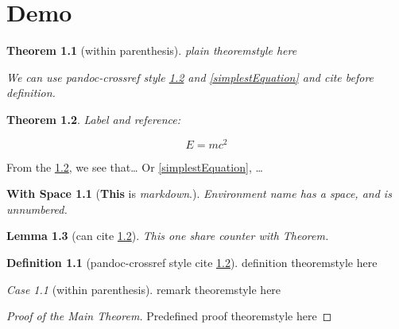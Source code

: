 \theoremstyle{plain}
\newtheorem{Theorem}{Theorem}[section]
\newtheorem{Lemma}[Theorem]{Lemma}
\newtheorem{Corollary}[Theorem]{Corollary}
\newtheorem*{With Space}{With Space}
\newtheorem{Proposition}{Proposition}[section]
\newtheorem{Conjecture}[Proposition]{Conjecture}
\newtheorem{WithoutSpace}{WithoutSpace}[section]
\newtheorem{KL}{Klein’s Lemma}[section]
\theoremstyle{definition}
\newtheorem{Definition}{Definition}[section]
\theoremstyle{remark}
\newtheorem{Case}{Case}[section]

\hypertarget{demo}{%
\chapter{Demo}\label{demo}}

\begin{Theorem}[within parenthesis]
plain theoremstyle \emph{here}

We can use pandoc-crossref style \ref{simplestEquation} and
\eqref{simplestEquation} and cite before definition.
\end{Theorem}

\begin{Theorem}\label{simplestEquation}
\leavevmode{}%
Label and reference:

\[E=mc^2\]
\end{Theorem}

From the \ref{simplestEquation}, we see that\ldots{} Or
\eqref{simplestEquation}, \ldots{}

\begin{With Space}[\textbf{This} is \emph{markdown}.]
Environment name has a space, and is unnumbered.
\end{With Space}

\begin{Lemma}[can cite \ref{simplestEquation}]
This one share counter with Theorem.
\end{Lemma}

\begin{Definition}[pandoc-crossref style cite \ref{simplestEquation}]
definition theoremstyle here
\end{Definition}

\begin{Case}[within parenthesis]
remark theoremstyle here
\end{Case}

\begin{proof}[Proof of the Main Theorem]
Predefined proof theoremstyle here
\end{proof}

